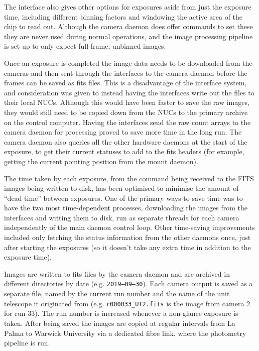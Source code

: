 \begin{colsection}
\begin{colsection}
The  interface also gives other options for exposures aside from just the exposure time, including different binning factors and windowing the active area of the chip to read out. Although the camera daemon does offer commands to set these they are never used during normal operations, and the image processing pipeline is set up to only expect full-frame, unbinned images.

Once an exposure is completed the image data needs to be downloaded from the cameras and then sent through the interfaces to the camera daemon before the frames can be saved as \gls{fits} files. This is a disadvantage of the interface system, and consideration was given to instead having the interfaces write out the files to their local NUCs. Although this would have been faster to save the raw images, they would still need to be copied down from the NUCs to the primary archive on the control computer. Having the interfaces send the raw count arrays to the camera daemon for processing proved to save more time in the long run. The camera daemon also queries all the other hardware daemons at the start of the exposure, to get their current statuses to add to the \gls{fits} headers (for example, getting the current pointing position from the mount daemon).

The time taken by each exposure, from the command being received to the FITS images being written to disk, has been optimised to minimise the amount of ``dead time'' between exposures. One of the primary ways to save time was to have the two most time-dependent processes, downloading the images from the interfaces and writing them to disk, run as separate threads for each camera independently of the main daemon control loop. Other time-saving improvements included only fetching the status information from the other daemons once, just after starting the exposures (so it doesn't take any extra time in addition to the exposure time).

Images are written to \gls{fits} files by the camera daemon and are archived in different directories by date (e.g. \texttt{2019--09--30}). Each camera output is saved as a separate file, named by the current run number and the name of the unit telescope it originated from (e.g. \texttt{r000033\_UT2.fits} is the image from camera 2 for run 33). The run number is increased whenever a non-glance exposure is taken. After being saved the images are copied at regular intervals from La Palma to Warwick University via a dedicated fibre link, where the photometry pipeline is run. 


\end{colsection}
\end{colsection}
